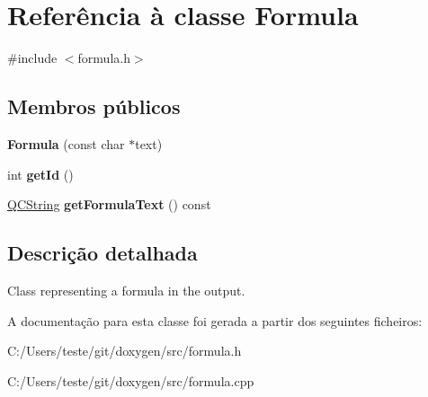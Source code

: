 \hypertarget{class_formula}{\section{Referência à classe Formula}
\label{class_formula}
}


{\ttfamily \#include $<$formula.\-h$>$}

\subsection*{Membros públicos}
\begin{DoxyCompactItemize}
\item 
\hypertarget{class_formula_ac3a44b2c8c327b3300f19cd96ad7403e}{{\bfseries Formula} (const char $\ast$text)}\label{class_formula_ac3a44b2c8c327b3300f19cd96ad7403e}

\item 
\hypertarget{class_formula_a67283be3f45257d1e0c474c563ebb6b6}{int {\bfseries get\-Id} ()}\label{class_formula_a67283be3f45257d1e0c474c563ebb6b6}

\item 
\hypertarget{class_formula_afa27ddbdc07cd9fb9de60154491f7e40}{\hyperlink{class_q_c_string}{Q\-C\-String} {\bfseries get\-Formula\-Text} () const }\label{class_formula_afa27ddbdc07cd9fb9de60154491f7e40}

\end{DoxyCompactItemize}


\subsection{Descrição detalhada}
Class representing a formula in the output. 

A documentação para esta classe foi gerada a partir dos seguintes ficheiros\-:\begin{DoxyCompactItemize}
\item 
C\-:/\-Users/teste/git/doxygen/src/formula.\-h\item 
C\-:/\-Users/teste/git/doxygen/src/formula.\-cpp\end{DoxyCompactItemize}
